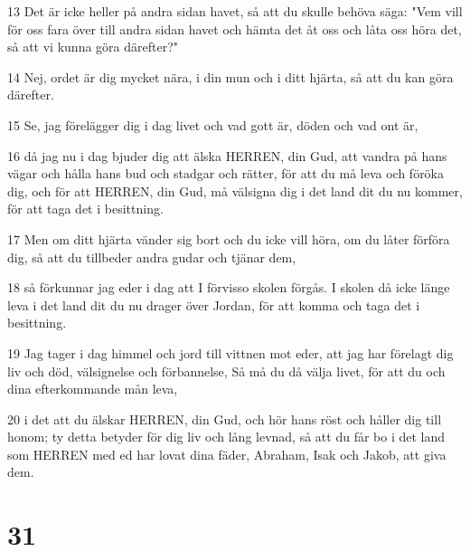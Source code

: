 \par 13 Det är icke heller på andra sidan havet, så att du skulle behöva säga: "Vem vill för oss fara över till andra sidan havet och hämta det åt oss och låta oss höra det, så att vi kunna göra därefter?"
\par 14 Nej, ordet är dig mycket nära, i din mun och i ditt hjärta, så att du kan göra därefter.
\par 15 Se, jag förelägger dig i dag livet och vad gott är, döden och vad ont är,
\par 16 då jag nu i dag bjuder dig att älska HERREN, din Gud, att vandra på hans vägar och hålla hans bud och stadgar och rätter, för att du må leva och föröka dig, och för att HERREN, din Gud, må välsigna dig i det land dit du nu kommer, för att taga det i besittning.
\par 17 Men om ditt hjärta vänder sig bort och du icke vill höra, om du låter förföra dig, så att du tillbeder andra gudar och tjänar dem,
\par 18 så förkunnar jag eder i dag att I förvisso skolen förgås. I skolen då icke länge leva i det land dit du nu drager över Jordan, för att komma och taga det i besittning.
\par 19 Jag tager i dag himmel och jord till vittnen mot eder, att jag har förelagt dig liv och död, välsignelse och förbannelse, Så må du då välja livet, för att du och dina efterkommande mån leva,
\par 20 i det att du älskar HERREN, din Gud, och hör hans röst och håller dig till honom; ty detta betyder för dig liv och lång levnad, så att du får bo i det land som HERREN med ed har lovat dina fäder, Abraham, Isak och Jakob, att giva dem.

\chapter{31}

